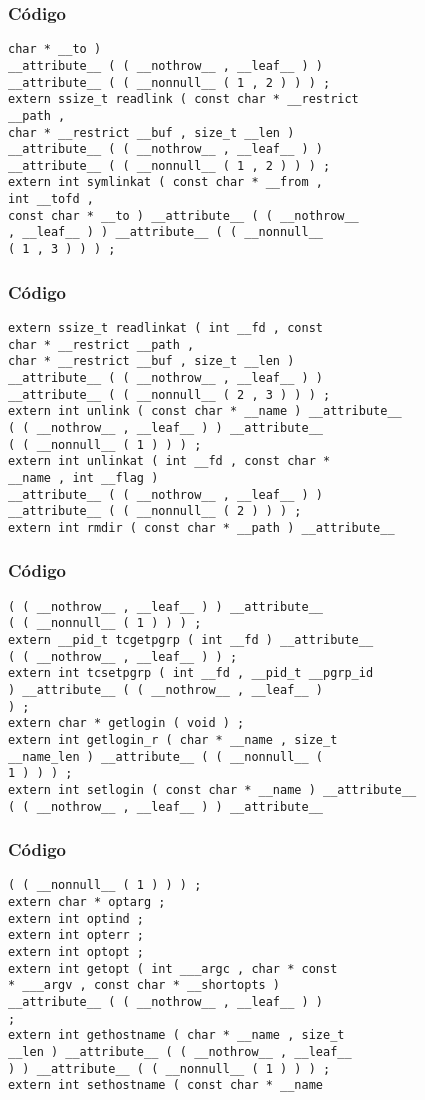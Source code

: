 \documentclass{beamer}
\begin{document}
\begin{frame}[fragile]
\frametitle{C\'odigo}
\begin{verbatim}
char * __to ) 
__attribute__ ( ( __nothrow__ , __leaf__ ) ) 
__attribute__ ( ( __nonnull__ ( 1 , 2 ) ) ) ; 
extern ssize_t readlink ( const char * __restrict 
__path , 
char * __restrict __buf , size_t __len ) 
__attribute__ ( ( __nothrow__ , __leaf__ ) ) 
__attribute__ ( ( __nonnull__ ( 1 , 2 ) ) ) ; 
extern int symlinkat ( const char * __from , 
int __tofd , 
const char * __to ) __attribute__ ( ( __nothrow__ 
, __leaf__ ) ) __attribute__ ( ( __nonnull__ 
( 1 , 3 ) ) ) ; 
\end{verbatim}
\end{frame}
\begin{frame}[fragile]
\frametitle{C\'odigo}
\begin{verbatim}
extern ssize_t readlinkat ( int __fd , const 
char * __restrict __path , 
char * __restrict __buf , size_t __len ) 
__attribute__ ( ( __nothrow__ , __leaf__ ) ) 
__attribute__ ( ( __nonnull__ ( 2 , 3 ) ) ) ; 
extern int unlink ( const char * __name ) __attribute__ 
( ( __nothrow__ , __leaf__ ) ) __attribute__ 
( ( __nonnull__ ( 1 ) ) ) ; 
extern int unlinkat ( int __fd , const char * 
__name , int __flag ) 
__attribute__ ( ( __nothrow__ , __leaf__ ) ) 
__attribute__ ( ( __nonnull__ ( 2 ) ) ) ; 
extern int rmdir ( const char * __path ) __attribute__ 
\end{verbatim}
\end{frame}
\begin{frame}[fragile]
\frametitle{C\'odigo}
\begin{verbatim}
( ( __nothrow__ , __leaf__ ) ) __attribute__ 
( ( __nonnull__ ( 1 ) ) ) ; 
extern __pid_t tcgetpgrp ( int __fd ) __attribute__ 
( ( __nothrow__ , __leaf__ ) ) ; 
extern int tcsetpgrp ( int __fd , __pid_t __pgrp_id 
) __attribute__ ( ( __nothrow__ , __leaf__ ) 
) ; 
extern char * getlogin ( void ) ; 
extern int getlogin_r ( char * __name , size_t 
__name_len ) __attribute__ ( ( __nonnull__ ( 
1 ) ) ) ; 
extern int setlogin ( const char * __name ) __attribute__ 
( ( __nothrow__ , __leaf__ ) ) __attribute__ 
\end{verbatim}
\end{frame}
\begin{frame}[fragile]
\frametitle{C\'odigo}
\begin{verbatim}
( ( __nonnull__ ( 1 ) ) ) ; 
extern char * optarg ; 
extern int optind ; 
extern int opterr ; 
extern int optopt ; 
extern int getopt ( int ___argc , char * const 
* ___argv , const char * __shortopts ) 
__attribute__ ( ( __nothrow__ , __leaf__ ) ) 
; 
extern int gethostname ( char * __name , size_t 
__len ) __attribute__ ( ( __nothrow__ , __leaf__ 
) ) __attribute__ ( ( __nonnull__ ( 1 ) ) ) ; 
extern int sethostname ( const char * __name 
\end{verbatim}
\end{frame}
\end{document}
